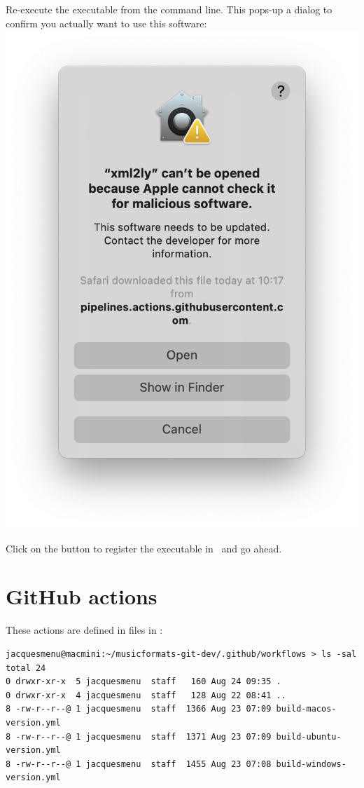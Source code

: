 Re-execute the executable from the command line. This pops-up a dialog to confirm you actually want to use this software:\\
\includegraphics[scale=0.35]{../mfgraphics/MacOSConfirmOpening.png}

Click on the  button to register the executable in \Gatekeeper\ and go ahead.





\section{GitHub actions}

These actions are defined in  files in :
\begin{lstlisting}[language=Terminal]
jacquesmenu@macmini:~/musicformats-git-dev/.github/workflows > ls -sal
total 24
0 drwxr-xr-x  5 jacquesmenu  staff   160 Aug 24 09:35 .
0 drwxr-xr-x  4 jacquesmenu  staff   128 Aug 22 08:41 ..
8 -rw-r--r--@ 1 jacquesmenu  staff  1366 Aug 23 07:09 build-macos-version.yml
8 -rw-r--r--@ 1 jacquesmenu  staff  1371 Aug 23 07:09 build-ubuntu-version.yml
8 -rw-r--r--@ 1 jacquesmenu  staff  1455 Aug 23 07:08 build-windows-version.yml
\end{lstlisting}

